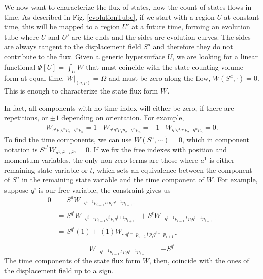 \documentclass[12pt]{article}
\begin{document}
We now want to characterize the flux of states, how the count of states flows in time. As described in Fig. \ref{evolutionTube}, if we start with a region $U$ at constant time, this will be mapped to a region $U'$ at a future time, forming an evolution tube where $U$ and $U'$ are the ends and the sides are evolution curves. The sides are always tangent to the displacement field $S^a$ and therefore they do not contribute to the flux. Given a generic hypersurface $U$, we are looking for a linear functional $\Phi[U] = \int_U W$ that must coincide with the state counting volume form at equal time, $W|_{(q,p)} = \Omega$ and must be zero along the flow, $W(S^a, \cdot) = 0$. This is enough to characterize the state flux form $W$.

In fact, all components with no time index will either be zero, if there are repetitions, or $\pm 1$ depending on orientation. For example,
\begin{equation}
    \begin{matrix}
        W_{q^1 p_1 q^2 p_2 \cdots q^n p_n} = 1 & W_{q^1 q^2 p_1 p_2 \cdots q^n p_n} = -1 & W_{q^1 q^1 q^2 p_2 \cdots q^n p_n} = 0.
    \end{matrix}
\end{equation}
To find the time components, we can use $W(S^a, \cdots) = 0$, which in component notation is $S^{a^1} W_{a^1 a^2 \cdots a^{2n}} = 0$. If we fix the free indexes with position and momentum variables, the only non-zero terms are those where $a^1$ is either remaining state variable or $t$, which sets an equivalence between the component of $S^a$ in the remaining state variable and the time component of $W$. For example, suppose $q^i$ is our free variable, the constraint gives us
\begin{equation}
\begin{aligned}
    0 &= S^a W_{\cdots q^{i-1}p_{i-1}\,a\,p_iq^{i+1}p_{i+1}\cdots} \\
    &= S^{q^i} W_{\cdots q^{i-1}p_{i-1}\,q^i\,p_iq^{i+1}p_{i+1}\cdots} + S^t W_{\cdots q^{i-1}p_{i-1}\,t\,p_iq^{i+1}p_{i+1}\cdots} \\
    &= S^{q^i} (1) + (1) W_{\cdots q^{i-1}p_{i-1}\,t\,p_iq^{i+1}p_{i+1}\cdots} \\
\end{aligned}
\end{equation}
\begin{equation}
    W_{\cdots q^{i-1}p_{i-1}\,t\,p_iq^{i+1}p_{i+1}\cdots} = -S^{q^i}
\end{equation}
The time components of the state flux form $W$, then, coincide with the ones of the displacement field up to a sign.
\end{document}
